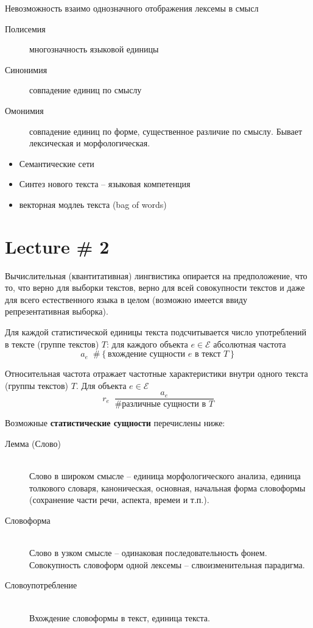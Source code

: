 \documentclass[a4paper]{article}
\newcommand{\obj}[1]{{\left\{ #1 \right \}}}
\newcommand{\defn}{\mathop{\overset{\Delta}{=}}\nolimits}
\newcommand{\eng}[1]{\foreignlanguage{english}{#1}}
\begin{document}
Невозможность взаимо однозначного отображения лексемы в смысл
\begin{description}
	\item[Полисемия] многозначность языковой единицы
	\item[Синонимия] совпадение единиц по смыслу
	\item[Омонимия] совпадение единиц по форме, существенное различие по смыслу.
	Бывает лексическая и морфологическая.
\end{description}

\begin{itemize}
	\item Семантические сети
	\item Синтез нового текста -- языковая компетенция
	\item векторная модлеь текста (\eng{bag of words})
\end{itemize}


\section{Lecture \# 2} %
\label{sec:lecture_2}

Вычислительная (квантитативная) лингвистика опирается на предположение, что то, что верно для выборки текстов, верно для всей совокупности текстов и даже для всего естественного языка в целом (возможно имеется ввиду репрезентативная выборка).

Для каждой статистической единицы текста подсчитывается число употреблений в тексте (группе текстов) $T$:
для каждого объекта $e\in \mathcal{E}$ абсолютная частота
\[a_e \defn \#\obj{\text{вхождение сущности } e \text{ в текст } T}\]

Относительная частота отражает частотные характеристики внутри одного текста (группы текстов) $T$.
Для объекта $e\in \mathcal{E}$ \[r_e \defn \frac{a_e}{\#\text{различные сущности в } T}\]

Возможные \textbf{статистические сущности} перечислены ниже:
\begin{description}
	\item[Лемма (Слово)] \hfill\\
	Слово в широком смысле -- единица морфологического анализа, единица толкового словаря, каноническая, основная, начальная форма словоформы (сохранение части речи, аспекта, времеи и т.п.).
	\item[Словоформа] \hfill\\
	Слово в узком смысле -- одинаковая последовательность фонем. Совокупность словоформ одной лексемы -- слвоизменительная парадигма.
	\item[Словоупотребление] \hfill\\
	Вхождение словоформы в текст, единица текста.
\end{description}
\end{document}
